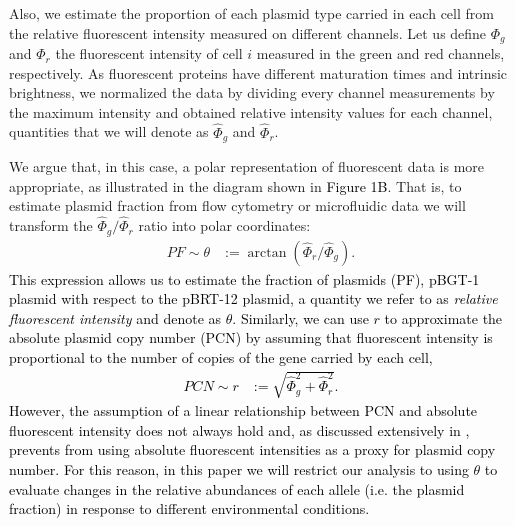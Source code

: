 \documentclass[fleqn,12pt]{wlscirep}
\newcommand{\blue}[1]{\textcolor{black}{#1}}
\newcommand{\fig}[1]{\textcolor{black}{#1}}
\begin{document}
Also, we estimate the proportion of each plasmid type carried in each cell from the relative fluorescent intensity measured on different channels.  
Let us define $\Phi_g$ and $\Phi_r$ the fluorescent intensity of cell $i$ measured in the green and red channels, respectively.  As fluorescent proteins have different maturation times and intrinsic brightness\cite{Balleza2018}, we normalized the data by dividing every channel measurements by the maximum intensity and obtained relative intensity values for each channel, quantities that we will denote as $\hat{\Phi}_g$ and $\hat{\Phi}_r$.  

We argue that, in this case, a polar representation of fluorescent data is more appropriate, as illustrated in the diagram shown in \fig{Figure 1B}.
That is, to estimate plasmid fraction from flow cytometry or microfluidic data we will transform the $\hat{\Phi}_g/\hat{\Phi}_r$ ratio into polar coordinates:
\begin{align*}
    PF \sim \theta &:=\arctan(\hat{\Phi}_r/\hat{\Phi}_g).
\end{align*}
\blue{This expression allows us to estimate the fraction of plasmids (PF), pBGT-1 plasmid  with respect to the pBRT-12 plasmid, a quantity we refer to as {\em relative fluorescent intensity} and denote as $\theta$. Similarly, we can use $r$ to approximate the absolute plasmid copy number (PCN) by assuming that fluorescent intensity is proportional to the number of copies of the gene carried by each cell,  
\begin{align*}
    PCN \sim r&:=\sqrt{\hat{\Phi}_g^2+\hat{\Phi}_r^2}.
\end{align*}
However, the assumption of a linear relationship between PCN and absolute fluorescent intensity does not always hold and, as discussed extensively in \cite{tal2012evaluating}, prevents from using absolute fluorescent intensities as a proxy for plasmid copy number.  For this reason, in this paper we will restrict our analysis to using $\theta$ to evaluate changes in the relative abundances of each allele (i.e. the plasmid fraction) in response to different environmental conditions.} 

\end{document}
